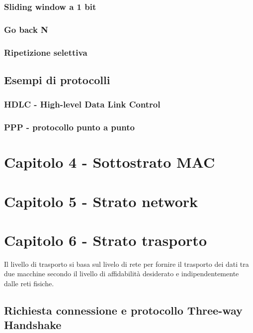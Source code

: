 \subsubsection{Sliding window a 1 bit}


\subsubsection{Go back N}


\subsubsection{Ripetizione selettiva}


\subsection{Esempi di protocolli} %

\subsubsection{HDLC - High-level Data Link Control}

\subsubsection{PPP - protocollo punto a punto}


\newpage
\section{Capitolo 4 - Sottostrato MAC}


\newpage
\section{Capitolo 5 - Strato network}


\newpage
\section{Capitolo 6 - Strato trasporto}
Il livello di trasporto si basa sul livelo di rete per fornire il trasporto dei dati tra due macchine secondo il livello di affidabilità desiderato e indipendentemente dalle reti fisiche. 

\subsection{Richiesta connessione e protocollo Three-way Handshake}

